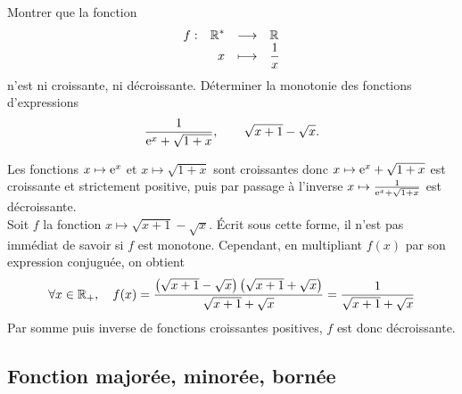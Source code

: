 \documentclass{magnolia}
\begin{document}
\begin{exos}
  \exo Montrer que la fonction
  \[\begin{array}[t]{lrcl} \displaystyle{f} : & \displaystyle{{\mathbb{R}^*}} & \longrightarrow & \displaystyle{\mathbb{R}} \\ & \displaystyle{x} & \longmapsto & \displaystyle{\frac{1}{x}} \end{array}\]
  n'est ni croissante, ni décroissante.
\exo Déterminer la monotonie des fonctions d'expressions
  \[\frac{1}{{\rm e}^x+\sqrt{1+x}}, \qquad \sqrt{x+1}-\sqrt{x}.\]
  \begin{sol}
Les fonctions $x\mapsto {\rm e}^{x}$ et $x \mapsto \sqrt{1+x}$ sont croissantes donc $ x\mapsto {\rm e}^x+\sqrt{1+x}$ est croissante et strictement positive, puis  par passage à l'inverse $ x \mapsto \frac{1}{{\rm e}^x+\sqrt{1+x}}$ est décroissante.\\
Soit $f$ la fonction $ x \mapsto \sqrt{x+1}-\sqrt{x}$. Écrit sous cette forme, il n'est pas immédiat de savoir si $f$ est monotone. Cependant, en multipliant $f(x)$ par son expression conjuguée, on obtient
  $$\forall x\in\mathbb{R}_+ ,\quad f(x)=\frac{
    \left(\sqrt{x+1}-\sqrt{x}\right)\left(\sqrt{x+1}+\sqrt{x}\right)}{\sqrt{x+1}+\sqrt{x}}
    =\frac{1}{\sqrt{x+1}+\sqrt{x}}$$
Par somme puis inverse de fonctions croissantes positives, $f$ est donc décroissante.
  \end{sol}
\end{exos}

\subsection{Fonction majorée, minorée, bornée}

\end{document}
